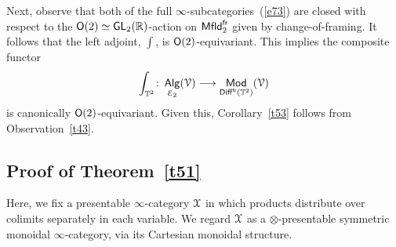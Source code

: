 \documentclass{amsart}
\theoremstyle{definition}
\theoremstyle{remark}
\DeclareMathOperator{\Alg}{\sf Alg}
\DeclareMathOperator{\Mod}{\sf Mod}
\newcommand{\lacts}{\curvearrowright}
\DeclareMathOperator{\Diff}{{\sf Diff}}
\DeclareMathOperator{\Mfld}{{\sf Mfld}}
\DeclareMathOperator{\fr}{\sf fr}
\def\ot{\otimes}
\newcommand{\lag}{\langle}
\newcommand{\rag}{\rangle}
\def\cE{\mathcal E}\def\cF{\mathcal F}\def\cG{\mathcal G}\def\cH{\mathcal H}
\DeclareMathOperator{\Braid}{{\sf Braid}_3}
\DeclareMathOperator{\GL}{\sf GL}
\DeclareMathOperator{\HHt}{{\sf HH}^{(2)}}
\begin{document}
%
%
%
%
%
%
%
%
%
%
%
%
%
%
%
%
%
%
%
%
%
%
%
%
%
%
%
%
%
%
%
%
%
%
%
%
%
%
%
%
%
%
%
%
%
%
%
%
%
%
%
%
%







Next, observe that both of the full $\infty$-subcategories~(\ref{e73}) are closed with respect to the $\sO(2)\simeq \GL_2(\RR)$-action on $\Mfld_2^{\fr}$ given by change-of-framing.
It follows that the left adjoint, $\int$, is $\mathsf O(2)$-equivariant.  
This implies the composite functor
\[
\int_{\TT^2}
\colon 
\Alg_{\cE_2}(\cV)
\longrightarrow
\Mod_{\Diff^{\fr}(\TT^2)}(\cV)
\]
is canonically $\mathsf O(2)$-equivariant.  
Given this, Corollary~\ref{t53} follows from Observation~\ref{t43}. 






















\subsection{Proof of Theorem~\ref{t51}}
Here, we fix a presentable $\infty$-category $\mathcal X$ in which products distribute over colimits separately in each variable.  
We regard $\mathcal X$ as a $\ot$-presentable symmetric monoidal $\infty$-category, via its Cartesian monoidal structure.
\end{document}
